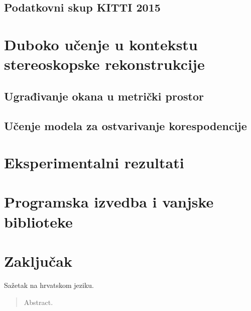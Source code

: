\documentclass[times, utf8, zavrsni, numeric]{fer}
\begin{document}
\section{Podatkovni skup KITTI 2015}
\chapter{Duboko učenje u kontekstu stereoskopske rekonstrukcije}
\section{Ugrađivanje okana u metrički prostor}
\section{Učenje modela za ostvarivanje korespodencije}
\chapter{Eksperimentalni rezultati}
\chapter{Programska izvedba i vanjske biblioteke}
\chapter{Zaključak}





\begin{sazetak}
Sažetak na hrvatskom jeziku.

\end{sazetak}

\begin{abstract}
Abstract.

\end{abstract}
\end{document}
